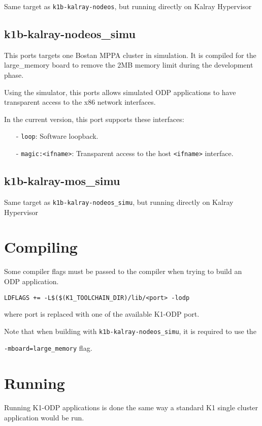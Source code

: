 \documentclass{trkalray}
\begin{document}
Same target as \texttt{k1b-kalray-nodeos}, but running directly on
Kalray Hypervisor

\subsection{k1b-kalray-nodeos\_simu}

This ports targets one Bostan MPPA cluster in simulation. It is
compiled for the large\_memory board to remove the 2MB memory limit
during the development phase.

Using the simulator, this ports allows simulated ODP applications to
have transparent access to the x86 network interfaces.

In the current version, this port supports these interfaces:
\begin{itemize}
\item[-]{\texttt{loop}: Software loopback.}
\item[-]{\texttt{magic:<ifname>}: Transparent access to the host
  \texttt{<ifname>} interface.}
\end{itemize}

\subsection{k1b-kalray-mos\_simu}

Same target as \texttt{k1b-kalray-nodeos\_simu}, but running directly on
Kalray Hypervisor

\section{Compiling}

Some compiler flags must be passed to the compiler when trying to
build an ODP application.

\begin{lstlisting}
LDFLAGS += -L$($(K1_TOOLCHAIN_DIR)/lib/<port> -lodp
\end{lstlisting}
where port is replaced with one of the available K1-ODP port.

Note that when building with \texttt{k1b-kalray-nodeos\_simu}, it is
required to use the

 \texttt{-mboard=large\_memory} flag.

\section{Running}

Running K1-ODP applications is done the same way a standard K1 single
cluster application would be run.
\end{document}

